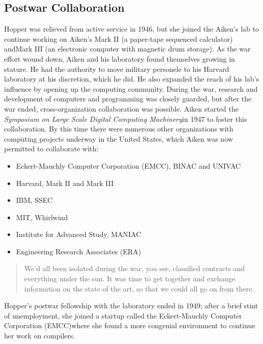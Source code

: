 \subsection{Postwar Collaboration}

Hopper was relieved from active service in 1946, but she joined the Aiken's
lab to continue working on Aiken's Mark II (a paper-tape sequenced calculator)
andMark III (an electronic computer with magnetic drum storage). As the war
effort wound down, Aiken and his laboratory found themselves growing in
stature. He had the authority to move military personele to his Harvard
laboratory at his discretion, which he did. He also expanded the reach of his
lab's influence by opening up the computing community. During the war, research
and development of computers and programming was closely guarded, but after the
war ended, cross-organization collaboration was possible. Aiken started the
\textit{Symposium on Large Scale Digital Computing Machinery}in 1947 to foster
this collaboration. By this time there were numerous other organizations with
computing projects underway in the United States, which Aiken was now permitted
to collaborate with:

\begin{itemize}
	\item Eckert-Mauchly Computer Corporation (EMCC), BINAC and UNIVAC
	\item Harvard, Mark II and Mark III
	\item IBM, SSEC
	\item MIT, Whirlwind
	\item Institute for Advanced Study, MANIAC
	\item Engineering Research Associates (ERA)
\end{itemize}
\begin{quotation}
	We'd all been isolated during the war, you see, classified
	contracts and everything under the sun. It was time to get together
	and exchange information on the state of the art, so that we could
	all go on from there.
\end{quotation}

Hopper's postwar fellowship with the laboratory ended in 1949; after a
brief stint of unemployment, she joined a startup called the
Eckert-Mauchly Computer Corporation (EMCC)where she found a more
congenial environment to continue her work on compilers.

